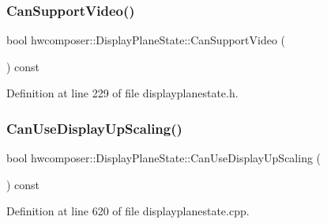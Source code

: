 \subsubsection{\texorpdfstring{Can\+Support\+Video()}{CanSupportVideo()}}
{\footnotesize\ttfamily bool hwcomposer\+::\+Display\+Plane\+State\+::\+Can\+Support\+Video (\begin{DoxyParamCaption}{ }\end{DoxyParamCaption}) const\hspace{0.3cm}{\ttfamily [inline]}}



Definition at line 229 of file displayplanestate.\+h.


\begin{DoxyCode}{0}
\end{DoxyCode}
\mbox{\label{classhwcomposer_1_1DisplayPlaneState_a1bf41f47af43cae6b25f4e69c117f31b}} 
\subsubsection{\texorpdfstring{Can\+Use\+Display\+Up\+Scaling()}{CanUseDisplayUpScaling()}}
{\footnotesize\ttfamily bool hwcomposer\+::\+Display\+Plane\+State\+::\+Can\+Use\+Display\+Up\+Scaling (\begin{DoxyParamCaption}{ }\end{DoxyParamCaption}) const}



Definition at line 620 of file displayplanestate.\+cpp.


